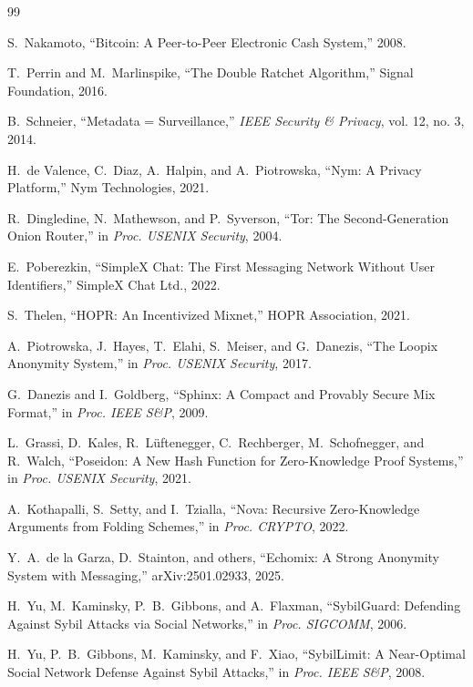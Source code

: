 \documentclass[11pt,a4paper]{article}
\begin{document}
\begin{thebibliography}{99}

S.~Nakamoto, ``Bitcoin: A Peer-to-Peer Electronic Cash System,'' 2008.

T.~Perrin and M.~Marlinspike, ``The Double Ratchet Algorithm,'' Signal Foundation, 2016.

B.~Schneier, ``Metadata = Surveillance,'' \textit{IEEE Security \& Privacy}, vol. 12, no. 3, 2014.

H.~de Valence, C.~Diaz, A.~Halpin, and A.~Piotrowska, ``Nym: A Privacy Platform,'' Nym Technologies, 2021.

R.~Dingledine, N.~Mathewson, and P.~Syverson, ``Tor: The Second-Generation Onion Router,'' in \textit{Proc. USENIX Security}, 2004.

E.~Poberezkin, ``SimpleX Chat: The First Messaging Network Without User Identifiers,'' SimpleX Chat Ltd., 2022.

S.~Thelen, ``HOPR: An Incentivized Mixnet,'' HOPR Association, 2021.

A.~Piotrowska, J.~Hayes, T.~Elahi, S.~Meiser, and G.~Danezis, ``The Loopix Anonymity System,'' in \textit{Proc. USENIX Security}, 2017.

G.~Danezis and I.~Goldberg, ``Sphinx: A Compact and Provably Secure Mix Format,'' in \textit{Proc. IEEE S\&P}, 2009.

L.~Grassi, D.~Kales, R.~L{\"u}ftenegger, C.~Rechberger, M.~Schofnegger, and R.~Walch, ``Poseidon: A New Hash Function for Zero-Knowledge Proof Systems,'' in \textit{Proc. USENIX Security}, 2021.

A.~Kothapalli, S.~Setty, and I.~Tzialla, ``Nova: Recursive Zero-Knowledge Arguments from Folding Schemes,'' in \textit{Proc. CRYPTO}, 2022.

Y.~A.~de la Garza, D.~Stainton, and others, ``Echomix: A Strong Anonymity System with Messaging,'' arXiv:2501.02933, 2025.

H.~Yu, M.~Kaminsky, P.~B.~Gibbons, and A.~Flaxman, ``SybilGuard: Defending Against Sybil Attacks via Social Networks,'' in \textit{Proc. SIGCOMM}, 2006.

H.~Yu, P.~B.~Gibbons, M.~Kaminsky, and F.~Xiao, ``SybilLimit: A Near-Optimal Social Network Defense Against Sybil Attacks,'' in \textit{Proc. IEEE S\&P}, 2008.


\end{thebibliography}
\end{document}
